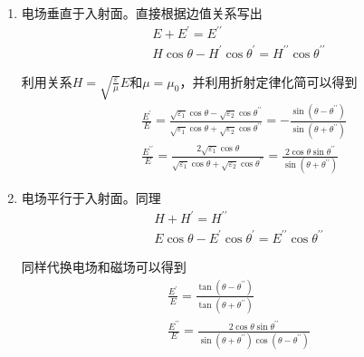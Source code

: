         \begin{enumerate}[(1)]
            \item 电场垂直于入射面。直接根据边值关系写出
                    \begin{equation}
                        \begin{gathered}
                            E + E^{\prime} = E^{\prime\prime} \\
                            H \cos \theta - H^{\prime} \cos \theta^{\prime} =H^{\prime\prime} \cos \theta^{\prime\prime}
                        \end{gathered}
                    \end{equation}
                    
                    利用关系$H=\sqrt{\frac{\varepsilon}{\mu}}E$和$\mu= \mu_0$，并利用折射定律化简可以得到
                    \begin{equation}
                        \label{eq.4_32}
                        \boxed{\begin{aligned}
                        &\frac{E^{\prime}}{E}=\frac{\sqrt{\varepsilon_{1}} \cos \theta-\sqrt{\varepsilon_{2}} \cos \theta^{\prime \prime}}{\sqrt{\varepsilon_{1}} \cos \theta+\sqrt{\varepsilon_{2}} \cos \theta^{\prime \prime}}=-\frac{\sin \left(\theta-\theta^{\prime \prime}\right)}{\sin \left(\theta+\theta^{\prime \prime}\right)} \\
                        &\frac{E^{\prime \prime}}{E}=\frac{2 \sqrt{\varepsilon_{1}} \cos \theta}{\sqrt{\varepsilon_{1}} \cos \theta+\sqrt{\varepsilon_{2}} \cos \theta^{\prime \prime}}=\frac{2 \cos \theta \sin \theta^{\prime \prime}}{\sin \left(\theta+\theta^{\prime \prime}\right)}
                        \end{aligned}}
                    \end{equation}
            \item 电场平行于入射面。同理
            \begin{equation}
                \begin{gathered}
                    H + H^{\prime} = H^{\prime\prime} \\
                    E \cos \theta - E^{\prime} \cos \theta^{\prime} =E^{\prime\prime} \cos \theta^{\prime\prime}
                \end{gathered}
            \end{equation}

            同样代换电场和磁场可以得到
            \begin{equation}
                \label{eq.4_34}
                \boxed{\begin{gathered}
                \frac{E^{\prime}}{E}=\frac{\tan \left(\theta-\theta^{\prime \prime}\right)}{\tan \left(\theta+\theta^{\prime \prime}\right)} \\
                \frac{E^{\prime \prime}}{E}=\frac{2 \cos \theta \sin \theta^{\prime \prime}}{\sin \left(\theta+\theta^{\prime \prime}\right) \cos \left(\theta-\theta^{\prime \prime}\right)}
                \end{gathered}}
            \end{equation}
        \end{enumerate}
